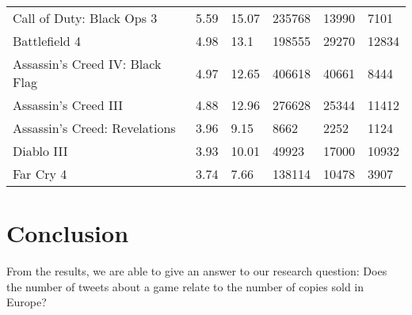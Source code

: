 \begin{table*}[!ht]
\begin{tabular}{llllll}
		\multicolumn{1}{l|}{Call of Duty: Black Ops 3}       & 5.59            & 15.07          & 235768                & 13990                                                                            & 7101                                                                            \\
		\multicolumn{1}{l|}{Battlefield 4}                   & 4.98            & 13.1           & 198555                & 29270                                                                            & 12834                                                                           \\
		\multicolumn{1}{l|}{Assassin's Creed IV: Black Flag} & 4.97            & 12.65          & 406618                & 40661                                                                            & 8444                                                                            \\
		\multicolumn{1}{l|}{Assassin's Creed III}            & 4.88            & 12.96          & 276628                & 25344                                                                            & 11412                                                                           \\
		\multicolumn{1}{l|}{Assassin's Creed: Revelations}   & 3.96            & 9.15           & 8662                  & 2252                                                                             & 1124                                                                            \\
		\multicolumn{1}{l|}{Diablo III}                      & 3.93            & 10.01          & 49923                 & 17000                                                                            & 10932                                                                           \\
		\multicolumn{1}{l|}{Far Cry 4}                       & 3.74            & 7.66           & 138114                & 10478                                                                            & 3907                                                                           
	\end{tabular}
\end{table*}
\section{Conclusion}
From the results, we are able to give an answer to our research question: Does the number of tweets about a game relate to the number of copies sold in Europe?

